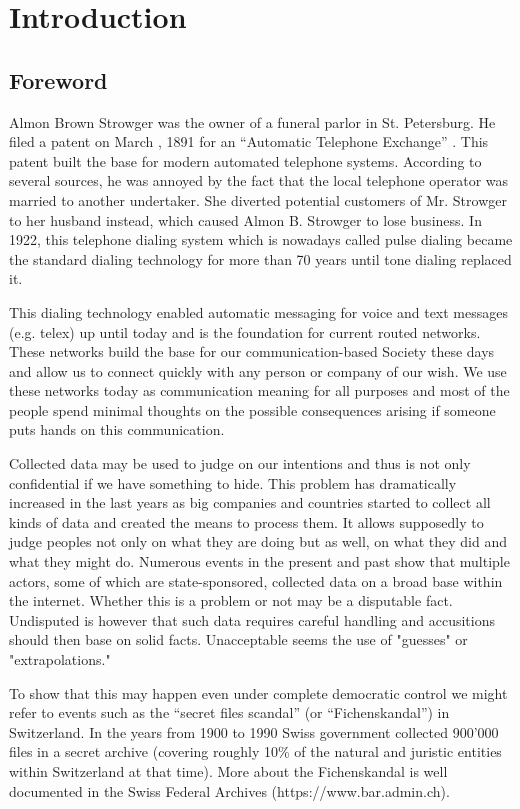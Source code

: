 
\part{Introduction}
\chapter{Foreword}
Almon Brown Strowger was the owner of a funeral parlor in St. Petersburg. He filed a patent on March , 1891 for an ``Automatic Telephone Exchange'' \cite{pulseDialingPatent}. This patent built the base for modern automated telephone systems. According to several sources, he was annoyed by the fact that the local telephone operator was married to another undertaker. She diverted potential customers of Mr. Strowger to her husband instead, which caused Almon B. Strowger to lose business. In 1922, this telephone dialing system which is nowadays called pulse dialing became the standard dialing technology
for more than 70 years until tone dialing replaced it.

This dialing technology enabled automatic messaging for voice and text messages (e.g. telex) up until today and is the foundation for current routed networks. These networks build the base for our communication-based Society these days and allow us to connect quickly with any person or company of our wish. We use these networks today as communication meaning for all purposes and most of the people spend minimal thoughts on the possible consequences arising if someone puts hands on this communication. 

Collected data may be used to judge on our intentions and thus is not only confidential if we have something to hide. This problem has dramatically increased in the last years as big companies and countries started to collect all kinds of data and created the means to process them. It allows supposedly to judge peoples not only on what they are doing but as well, on what they did and what they might do. Numerous events in the present and past show that multiple actors, some of which are state-sponsored, collected data on a broad base within the internet. Whether this is a problem or not may be a disputable fact. Undisputed is however that such data requires careful handling and accusitions should then base on solid facts. Unacceptable seems the use of "guesses" or "extrapolations." 

To show that this may happen even under complete democratic control we might refer to events such as the ``secret files scandal'' (or  ``Fichenskandal'') in Switzerland. In the years from 1900 to 1990 Swiss government collected 900’000 files in a secret archive (covering roughly 10\% of the natural and juristic entities within Switzerland at that time). More about the Fichenskandal is well documented in the Swiss Federal Archives (https://www.bar.admin.ch).

